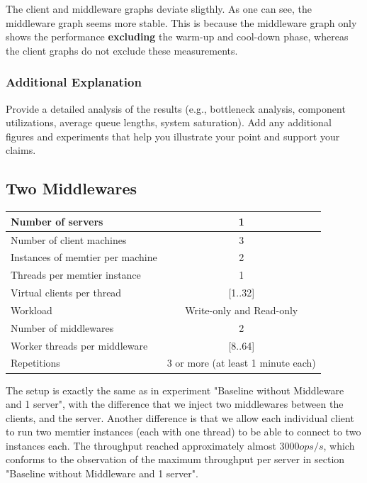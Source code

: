 \documentclass[11pt,a4paper]{article}
\begin{document}
The client and middleware graphs deviate sligthly.
As one can see, the middleware graph seems more stable.
This is because the middleware graph only shows the performance \textbf{excluding} the warm-up and cool-down phase, whereas the client graphs do not exclude these measurements.

\subsubsection{Additional Explanation}


Provide a detailed analysis of the results (e.g., bottleneck analysis, component utilizations, average queue lengths, system saturation). Add any additional figures and experiments that help you illustrate your point and support your claims.

\subsection{Two Middlewares}

\begin{center}
	\scriptsize{
		\begin{tabular}{|l|c|}
			\hline Number of servers                & 1                        \\ 
			\hline Number of client machines        & 3                        \\ 
			\hline Instances of memtier per machine & 2                        \\ 
			\hline Threads per memtier instance     & 1                        \\
			\hline Virtual clients per thread       & [1..32]                  \\ 
			\hline Workload                         & Write-only and Read-only \\
			\hline Number of middlewares            & 2                        \\
			\hline Worker threads per middleware    & [8..64]                  \\
			\hline Repetitions                      & 3 or more (at least 1 minute each)                \\ 
			\hline 
		\end{tabular}
	} 
\end{center}

The setup is exactly the same as in experiment "Baseline without Middleware and 1 server", with the difference that we inject two middlewares between the clients, and the server.
Another difference is that we allow each individual client to run two memtier instances (each with one thread) to be able to connect to two instances each.
The throughput reached approximately almost $3000ops/s$, which conforms to the observation of the maximum throughput per server in section "Baseline without Middleware and 1 server". \\
\end{document}
